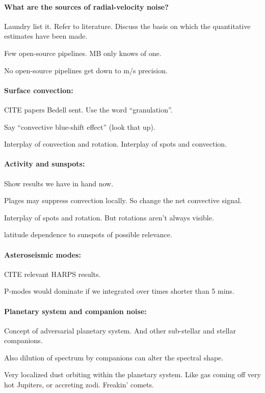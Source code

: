 \documentclass[12pt, fullpage, letterpaper]{article}
\begin{document}
\paragraph{What are the sources of radial-velocity noise?}
Laundry list it. Refer to literature. Discuss the basis on
which the quantitative estimates have been made.

Few open-source pipelines. MB only knows of one.

No open-source pipelines get down to m/s precision.

\paragraph{Surface convection:}
CITE papers Bedell sent. Use the word ``granulation''.

Say ``convective blue-shift effect'' (look that up).

Interplay of convection and rotation. Interplay of spots and convection.

\paragraph{Activity and sunspots:}
Show results we have in hand now.

Plages may suppress convection locally. So change the net convective signal.

Interplay of spots and rotation. But rotations aren't always visible.

latitude dependence to sunspots of possible relevance.

\paragraph{Asteroseismic modes:}
CITE relevant HARPS results.

P-modes would dominate if we integrated over times shorter than 5 mins.

\paragraph{Planetary system and companion noise:}
Concept of adversarial planetary system. And other sub-stellar and stellar companions.

Also dilution of spectrum by companions can alter the spectral shape.

Very localized dust orbiting within the planetary system. Like gas
coming off very hot Jupiters, or accreting zodi. Freakin' comets.
\end{document}
